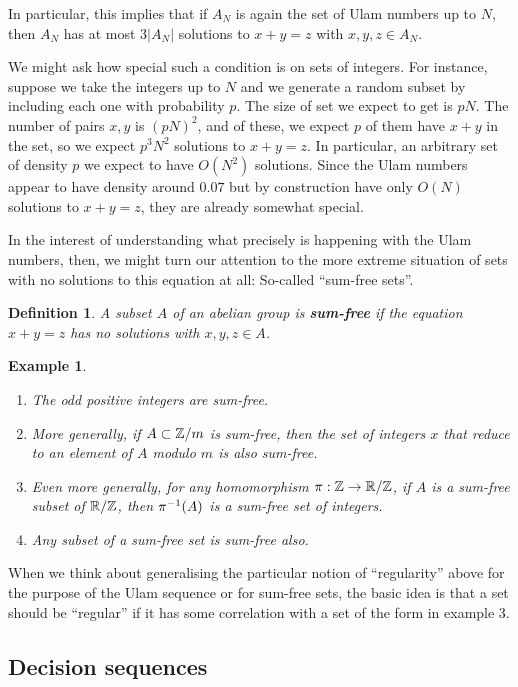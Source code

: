 \documentclass{report}
\newtheorem{definition}[theorem]{Definition}
\newtheorem{example}{Example}
\theoremstyle{remark}
\numberwithin{equation}{section}
\begin{document}
In particular, this implies that if $A_N$ is again the set of Ulam
numbers up to $N$, then $A_N$ has at most $3|A_N|$ solutions to $x+y =
z$ with $x, y, z \in A_N$.  

We might ask how special such a condition is on sets of integers.  For
instance, suppose we take the integers up to $N$ and we generate a
random subset by including each one with probability $p$.  The size of
set we expect to get is $pN$.  The number of pairs $x,y$ is $(pN)^2$,
and of these, we expect $p$ of them have $x+y$ in the set, so we
expect $p^3 N^2$ solutions to $x+y=z$.  In particular, an arbitrary
set of density $p$ we expect to have $O(N^2)$ solutions.  Since the
Ulam numbers appear to have density around $0.07$ but by construction
have only $O(N)$ solutions to $x+y=z$, they are already somewhat
special.  

In the interest of understanding what precisely is happening with the
Ulam numbers, then, we might turn our attention to the more extreme
situation of sets with no solutions to this equation at all: So-called
``sum-free sets''.  

\begin{definition}
  A subset $A$ of an abelian group is \textbf{sum-free} if the
  equation $x+y=z$ has no solutions with $x, y, z \in A$.
\end{definition}

\begin{example}
\begin{enumerate}
\item The odd positive integers are sum-free.  
\item More generally, if $A \subset \mathbb{Z}/m$ is sum-free, then the set of
  integers $x$ that reduce to an element of $A$ modulo $m$ is also
  sum-free.  
\item Even more generally, for any homomorphism $\pi : \mathbb{Z} \to \mathbb{R}/\mathbb{Z}$,
  if $A$ is a sum-free subset of $\mathbb{R}/\mathbb{Z}$, then $\pi^{-1}(A)$ is a
  sum-free set of integers.
\item Any subset of a sum-free set is sum-free also.
\end{enumerate}
\end{example}

When we think about generalising the particular notion of
``regularity'' above for the purpose of the Ulam sequence or for
sum-free sets, the basic idea is that a set should be ``regular'' if
it has some correlation with a set of the form in example 3.

\subsection{Decision sequences}
\end{document}
